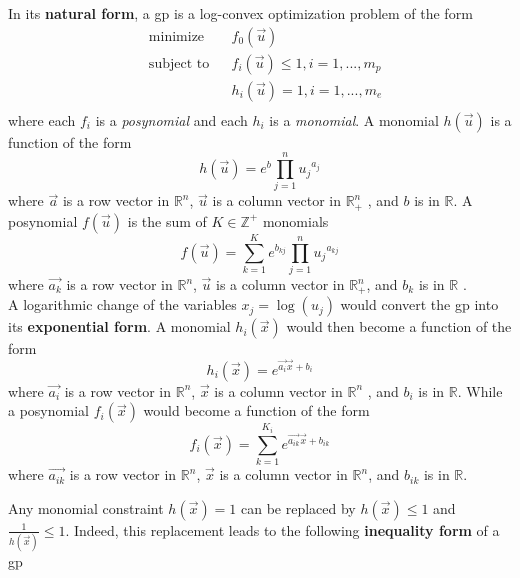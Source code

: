 In its \textbf{natural form}, a \gls{gp} is a log-convex optimization problem of the form
\begin{equation}
\begin{aligned}
	& \text{minimize} && f_0 \left(\vec{u}\right) \\
	& \text{subject to} && f_i \left(\vec{u}\right) \leq 1, i = 1,...,m_p\\
	& && h_i \left(\vec{u}\right) = 1, i = 1, ...,m_e\\
\end{aligned}
\label{GP_standard}
\end{equation}
where each $f_i$ is a {\em posynomial} and each $h_i$ is a {\em monomial}. A monomial $h(\vec{u})$ is a function of the form
\begin{displaymath}
	h(\vec{u}) = e^{b}\textstyle{\prod}_{j=1}^{n}{u_j}^{a_j}
\end{displaymath}
where $\vec{a}$ is a row vector in $\mathbb{R}^n$, $\vec{u}$ is a column vector in $\mathbb{R}^n_+$ , and $b$ is in $\mathbb{R}$. A posynomial $f(\vec{u})$ is the sum of $K \in \mathbb{Z}^+$ monomials
\begin{displaymath}
	f(\vec{u}) = \textstyle{\sum_{k=1}^{K}}e^{b_{kj}}\prod_{j=1}^{n}{u_j}^{a_{kj}}
\end{displaymath}
where $\vec{a_{k}}$ is a row vector in $\mathbb{R}^n$, $\vec{u}$ is a column vector in $\mathbb{R}^n_+$, and $b_{k}$ is in $\mathbb{R}$ \cite{GP_tutorial}.\\
A logarithmic change of the variables $x_j = \log(u_j)$ would convert the \gls{gp} into its \textbf{exponential form}. A monomial $h_i(\vec{x})$ would then become a function of the form
\begin{displaymath}
    h_i(\vec{x}) = e^{\vec{a_i}\vec{x} + b_i}
\end{displaymath}
where $\vec{a_i}$ is a row vector in $\mathbb{R}^n$, $\vec{x}$ is a column vector in $\mathbb{R}^n$ , and $b_i$ is in $\mathbb{R}$. While a posynomial $f_i(\vec{x})$ would become a function of the form
\begin{displaymath}
    f_i(\vec{x}) = \textstyle{\sum_{k=1}^{K_i}}e^{\vec{a_{ik}}\vec{x} + b_{ik}}
\end{displaymath}
where $\vec{a_{ik}}$ is a row vector in $\mathbb{R}^n$, $\vec{x}$ is a column vector in $\mathbb{R}^n$, and $b_{ik}$ is in $\mathbb{R}$.

Any monomial constraint $h(\vec{x}) = 1$ can be replaced by $h(\vec{x}) \leq 1$ and $\frac{1}{h(\vec{x})} \leq 1$. Indeed, this replacement leads to the following \textbf{inequality form} of a \gls{gp}

